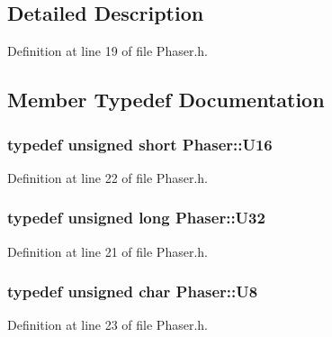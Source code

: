 \subsection{Detailed Description}


Definition at line 19 of file Phaser.h.

\subsection{Member Typedef Documentation}
\hypertarget{classPhaser_acadd65d66e8b38a16ad37a23834ee513}{
\subsubsection[{U16}]{\setlength{\rightskip}{0pt plus 5cm}typedef unsigned short {\bf Phaser::U16}}}
\label{classPhaser_acadd65d66e8b38a16ad37a23834ee513}


Definition at line 22 of file Phaser.h.\hypertarget{classPhaser_a733b5d40a397fc633db055248c76a23f}{
\subsubsection[{U32}]{\setlength{\rightskip}{0pt plus 5cm}typedef unsigned long {\bf Phaser::U32}}}
\label{classPhaser_a733b5d40a397fc633db055248c76a23f}


Definition at line 21 of file Phaser.h.\hypertarget{classPhaser_a09f745e43da83ab27286e69179755361}{
\subsubsection[{U8}]{\setlength{\rightskip}{0pt plus 5cm}typedef unsigned char {\bf Phaser::U8}}}
\label{classPhaser_a09f745e43da83ab27286e69179755361}


Definition at line 23 of file Phaser.h.

